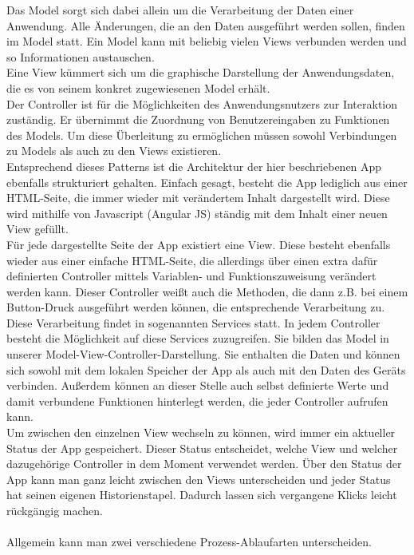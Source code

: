 Das Model sorgt sich dabei allein um die Verarbeitung der Daten einer Anwendung. Alle Änderungen, die an den Daten ausgeführt werden sollen, finden im Model statt. Ein Model kann mit beliebig vielen Views verbunden werden und so Informationen austauschen. 
\\
Eine View kümmert sich um die graphische Darstellung der Anwendungsdaten, die es von seinem konkret zugewiesenen Model erhält. 
\\
Der Controller ist für die Möglichkeiten des Anwendungsnutzers zur Interaktion zuständig. Er übernimmt die Zuordnung von Benutzereingaben zu Funktionen des Models. Um diese Überleitung zu ermöglichen müssen sowohl Verbindungen zu Models als auch zu den Views existieren.
\\
Entsprechend dieses Patterns ist die Architektur der hier beschriebenen App ebenfalls strukturiert gehalten. Einfach gesagt, besteht die App lediglich aus einer HTML-Seite, die immer wieder mit verändertem Inhalt dargestellt wird. Diese wird mithilfe von Javascript (Angular JS) ständig mit dem Inhalt einer neuen View gefüllt.
\\
Für jede dargestellte Seite der App existiert eine View. Diese besteht ebenfalls wieder aus einer einfache HTML-Seite, die allerdings über einen extra dafür definierten Controller mittels Variablen- und Funktionszuweisung verändert werden kann. Dieser Controller weißt auch die Methoden, die dann z.B. bei einem Button-Druck ausgeführt werden können, die entsprechende Verarbeitung zu.
\\
Diese Verarbeitung findet in sogenannten Services statt. In jedem Controller besteht die Möglichkeit auf diese Services zuzugreifen. Sie bilden das Model in unserer Model-View-Controller-Darstellung. Sie enthalten die Daten und können sich sowohl mit dem lokalen Speicher der App als auch mit den Daten des Geräts verbinden. Außerdem können an dieser Stelle auch selbst definierte Werte und damit verbundene Funktionen hinterlegt werden, die jeder Controller aufrufen kann.
\\
Um zwischen den einzelnen View wechseln zu können, wird immer ein aktueller Status der App gespeichert. Dieser Status entscheidet, welche View und welcher dazugehörige Controller in dem Moment verwendet werden. Über den Status der App kann man ganz leicht zwischen den Views unterscheiden und jeder Status hat seinen eigenen Historienstapel. Dadurch lassen sich vergangene Klicks leicht rückgängig machen.
\\
\\
Allgemein kann man zwei verschiedene Prozess-Ablaufarten unterscheiden. 

